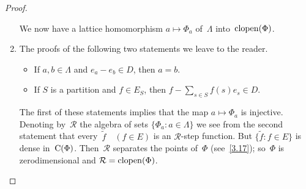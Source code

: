 \documentclass[main.tex]{subfiles}
\begin{document}
\begin{proof}
\begin{enumerate}[label=(\Roman*),leftmargin=*]
We now have a lattice homomorphism $a\mapsto \Phi_a$
of~$\Lambda$ into~$\mathrm{clopen}(\Phi)$.
%
\item \label{3.20-VIII}
The proofs of the following two statements 
we leave to the reader.
\begin{itemize}
\item 
If $a,b\in \Lambda$ and $e_a - e_b \in D$, then $a=b$.
\item
If $S$ is a partition and $f\in E_S$, 
then $f-\sum_{s\in S} f(s)e_s \in D$.
\end{itemize}
The first of these statements implies
that the map $a\mapsto \Phi_a$ is injective.
Denoting by~$\mathcal{R}$ 
the algebra of sets $\{ \Phi_a\colon a\in \Lambda \}$
we see from the second statement that every~$\tilde{f}\quad(f\in E)$
is an $\mathcal{R}$-step function.
But $\{\tilde{f}\colon f\in E\}$ is dense in~$\mathrm{C}(\Phi)$.
Then~$\mathcal{R}$ separates the points of~$\Phi$
(see~\ref{3.17});
so~$\Phi$ is zerodimensional and $\mathcal{R}=\mathrm{clopen}(\Phi)$.~\xqed
\end{enumerate}
\end{proof}
\clearpage
\end{document}
